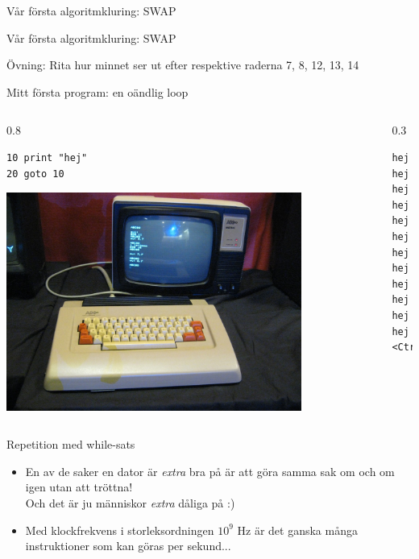 \documentclass{lecturenotes}
\begin{document}
\begin{Slide}{Vår första algoritmkluring: SWAP}

\end{Slide}

\begin{Slide}{Vår första algoritmkluring: SWAP}

\footnotesize Övning: Rita hur minnet ser ut efter respektive raderna 7, 8, 12, 13, 14
\end{Slide}


\begin{Slide}{Mitt första program: en oändlig loop}
\begin{columns}
\begin{column}{0.8\textwidth}
\begin{verbatim}
10 print "hej"
20 goto 10
\end{verbatim}
\includegraphics[width=0.8\textwidth]{img/abc80.jpg}
\end{column}
\begin{column}{0.3\textwidth}
\pause
\begin{verbatim}
hej
hej
hej
hej
hej
hej
hej
hej
hej
hej
hej
hej
<Ctrl+C>
\end{verbatim}

\end{column}
\end{columns}
\end{Slide}

\begin{Slide}{Repetition med while-sats}

\pause
\begin{itemize}
\item En av de saker en dator är \textit{extra} bra på är att göra samma sak om och om igen utan att tröttna! \\
Och det är ju människor \textit{extra} dåliga på :)
\item Med klockfrekvens i storleksordningen $10^9$ Hz är det ganska många instruktioner som kan göras per sekund...
\end{itemize}
\end{Slide}
\end{document}
